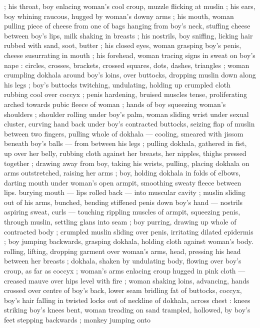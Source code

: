; his throat, boy enlacing woman's cool croup, muzzle flicking at 
muslin ; his ears, boy whining raucous, hugged by woman's downy 
arms ; his mouth, woman pulling piece of cheese from one of bags 
hanging from boy's neck, stuffing cheese between boy's lips, milk 
shaking in breasts ; his nostrils, boy sniffing, licking hair rubbed with 
sand, soot, butter ; his closed eyes, woman grasping boy's penis, 
cheese susurrating in mouth ; his forehead, woman tracing signs in 
sweat on boy's nape : circles, crosses, brackets, crossed squares, 
dots, dashes, triangles ; woman crumpling dokhala around boy's 
loins, over buttocks, dropping muslin down along his legs ; boy's 
buttocks twitching, undulating, holding up crumpled cloth rubbing 
cool over coccyx ; penis hardening, bruised muscles tense, 
proliferating arched towards pubic fleece of woman ; hands of boy 
squeezing woman's shoulders ; shoulder rolling under boy's palm, 
woman sliding wrist under sexual cluster, curving hand back under 
boy's contracted buttocks, seizing flap of muslin between two 
fingers, pulling whole of dokhala --- cooling, smeared with jissom 
beneath boy's balls --- from between his legs ; pulling dokhala, 
gathered in fist, up over her belly, rubbing cloth against her breasts, 
her nipples, thighs pressed together ; drawing away from boy, taking 
his wrists, pulling, placing dokhala on arms outstretched, raising her 
arms ; boy, holding dokhala in folds of elbows, darting mouth under 
woman's open armpit, smoothing sweaty fleece between lips. 
burying mouth --- lips rolled back --- into muscular cavity ; muslin 
sliding out of his arms, bunched, bending stiffened penis down boy's 
hand --- nostrils aspiring sweat, curls --- touching rippling muscles 
of armpit, squeezing penis, through muslin, settling glans into seam 
; boy purring, drawing up whole of contracted body ; crumpled 
muslin sliding over penis, irritating dilated epidermis ; boy jumping 
backwards, grasping dokhala, holding cloth against woman's body. 
rolling, lifting, dropping garment over woman's arms, head, pressing 
his head between her breasts ; dokhala, shaken by undulating body, 
flowing over boy's croup, as far as coccyx ; woman's arms enlacing 
croup hugged in pink cloth --- creased mauve over hips level with fire 
; woman shaking loins, advancing, hands crossed over centre of 
boy's back, lower seam bridling fat of buttocks, coccyx, boy's hair 
falling in twisted locks out of neckline of dokhala, across chest : 
knees striking boy's knees bent, woman treading on sand trampled, 
hollowed, by boy's feet stepping backwards ; monkey jumping onto 
